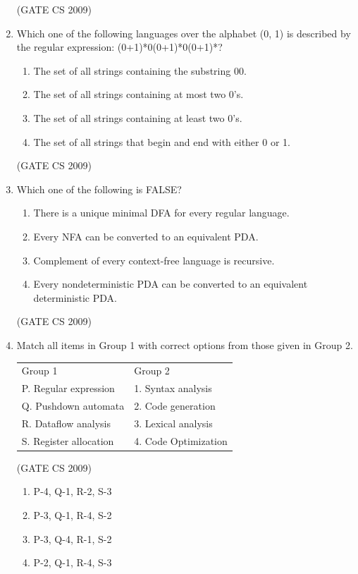 \documentclass[a4paper, 11pt]{article}
\begin{document}
\begin{enumerate}
    \hfill (GATE CS 2009)

    \item Which one of the following languages over the alphabet (0, 1) is described by the regular expression: (0+1)*0(0+1)*0(0+1)*?
    \begin{enumerate} 
        \item The set of all strings containing the substring 00. 
        \item The set of all strings containing at most two 0's.
        \item The set of all strings containing at least two 0's.
        \item The set of all strings that begin and end with either 0 or 1.
    \end{enumerate}

    \hfill (GATE CS 2009)

    \item Which one of the following is FALSE?
    \begin{enumerate} 
        \item There is a unique minimal DFA for every regular language.
        \item Every NFA can be converted to an equivalent PDA.
        \item Complement of every context-free language is recursive.
        \item Every nondeterministic PDA can be converted to an equivalent deterministic PDA.
    \end{enumerate}

    \hfill (GATE CS 2009)

    \item Match all items in Group 1 with correct options from those given in Group 2.\\
    \begin{tabular}{ll}
        Group 1 & Group 2 \\
        P. Regular expression & 1. Syntax analysis\\
        Q. Pushdown automata & 2. Code generation\\
        R. Dataflow analysis & 3. Lexical analysis \\
        S. Register allocation & 4. Code Optimization
    \end{tabular}

    \hfill (GATE CS 2009)
    
    \begin{enumerate} 
        \item P-4, Q-1, R-2, S-3
        \item P-3, Q-1, R-4, S-2 
        \item P-3, Q-4, R-1, S-2
        \item P-2, Q-1, R-4, S-3
    \end{enumerate}


\end{enumerate}
\end{document}
